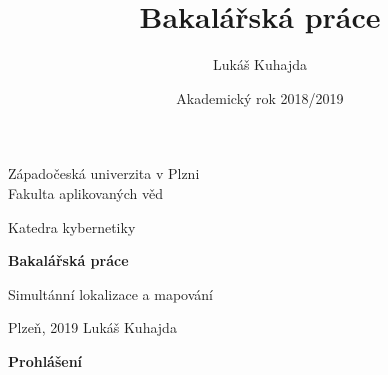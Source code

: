 \documentclass[12pt]{report}
\begin{document}
	
\title{Bakalářská práce}
\author{Lukáš Kuhajda}
\date{Akademický rok 2018/2019}

\begin{titlepage}
	\begin{center}
		\begin{huge}
			Západočeská univerzita v Plzni\\
			Fakulta aplikovaných věd\\
		\end{huge}
		\vspace{0.3cm}
		\begin{LARGE}
			Katedra kybernetiky\\
		\end{LARGE}
		\vspace{7cm}
		\begin{Huge}
			\textbf{Bakalářská práce}\\
		\end{Huge}
		\vspace{1cm}
		\begin{Large}
			Simultánní lokalizace a mapování\\
		\end{Large}
		\vspace{8cm}
	\end{center}
	\large{Plzeň, 2019}		\quad \quad \quad \quad \quad \quad\quad \quad\quad\quad\quad\quad\quad\quad\quad\quad\quad\quad\quad \large{Lukáš Kuhajda}
\end{titlepage}


\newpage

\noindent\textbf{\Large{Prohlášení}}\\
\end{document}
